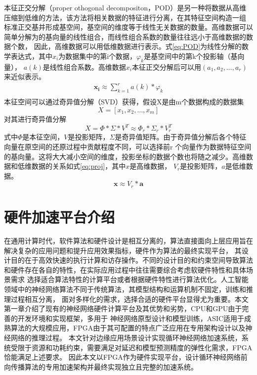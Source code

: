 本征正交分解（proper othogonal decompositon，POD）是另一种将数据从高维压缩到低维的方法，该方法将相关数据的特征进行分离，在其特征空间构造一组
标准正交基并形成基空间，基空间的维度等于线性无关数据的数量。高维数据可以简单分解为的基向量的线性组合，而线性组合系数的数量往往远小于高维数据的数据个数，
因此，高维数据可以用低维数据进行表示。式\ref{eq:POD}为线性分解的数学表达式，其中\(x_i\)为数据集中的第i个数据，\(\varphi _k\)是基空间中的第k个投影轴（基向量），
\(a(k)\)是线性组合系数。高维数据\(x_i\)本征正交分解后可以用\((a_1,a_2,...,a_r)\)来近似表示。
\begin{equation}\label{eq:POD}
	\begin{split}
		\mathbf{x_i} \approx \sum_{k=1}^{r}a(k)*\varphi _k		\\
	\end{split}
\end{equation}
本征空间可以通过奇异值分解（SVD）获得，假设X是由m个数据构成的数据集
\begin{equation}
	X = [x_1,x_2,...,x_m]
\end{equation}
对其进行奇异值分解
\begin{equation}
	X = \Phi * \Sigma *V^T \approx \Phi _r * \Sigma _r * V_r^T
\end{equation}
式中\(\Phi\)是本征空间，\(V\)是投影矩阵，\(\Sigma\)是奇异值矩阵。由于奇异值分解后各个特征向量在原空间的还原过程中贡献程度不同，可以选择前r
个向量作为数据特征空间的基向量。这将大大减小空间的维度，投影坐标的数据个数也将随之减少。高维数据和低维数据的关系如式\ref{eq:proj}，其中\(x\)是高维数据，
\(V_r\)是投影矩阵，\(a\)是低维数据。
\begin{equation}\label{eq:proj}
	\mathbf{x} \approx V_r * \mathbf{a}
\end{equation}

\section{硬件加速平台介绍}
在通用计算时代，软件算法和硬件设计是相互分离的，算法直接面向上层应用旨在解决复杂的应用问题和提升应用效果指标，硬件作为算法的最终实现平台，
其设计目的在于高效快速的执行计算和访存操作。不同的设计目的和约束空间导致算法和硬件存在各自的特性，在实际应用过程中往往需要综合考虑软硬件特性和具体场景需求
选择适合算法特性的计算平台或者根据硬件特性进行算法优化。人工智能领域中的神经网络算法不同于传统算法，其模型结构和运算机制不固定，训练和推理过程相互分离，
面对多样化的需求，选择合适的硬件平台显得尤为重要。本文第一章介绍了现有的神经网络硬件计算平台及其优势和劣势，CPU和GPU由于完善的开发环境和实现框架，多用于
神经网络原型设计和模型训练，ASIC适用于成熟算法的大规模应用，FPGA由于其可配置的特点广泛应用在专用架构设计以及神经网络的推理过程。
本文针对边缘应用场景设计实现循环神经网络加速系统，系统受限于资源和功耗约束，需要满足对延迟和模型预测精度的弹性化需求，FPGA恰能满足上述要求。
因此本文以FPGA作为硬件实现平台，设计循环神经网络前向传播算法的专用加速架构并最终实现独立且完整的加速系统。

